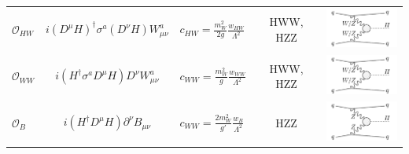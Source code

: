 \begin{tabular}{lcm{3cm}<{\centering}cm{4.5cm}<{\centering}}
    $\mathcal{O}_{HW}$ & $i(D^\mu H)^{\dagger}\sigma^a(D^\nu H)W^a_{\mu\nu}$ & $c_{HW}=\frac{m_W^2}{2g}\frac{w_{HW}}{\Lambda^2}$ & HWW, HZZ  & \vspace{.1cm}\includegraphics[width=2.5cm]{Figures/eft/eft_feynman/cHW.pdf} \\
    
    $\mathcal{O}_{WW}$ & $i(H^{\dagger}\sigma^aD^\mu H)D^\nu W^a_{\mu\nu}$ & $c_{WW}=\frac{m_W^2}{g}\frac{w_{WW}}{\Lambda^2}$ & HWW, HZZ & \vspace{.1cm}\includegraphics[width=2.5cm]{Figures/eft/eft_feynman/cHW.pdf} \\
    
    $\mathcal{O}_B$ & $i(H^{\dagger}D^\mu H)\partial^\nu B_{\mu\nu}$ & $c_{WW}=\frac{2m_W^2}{g'}\frac{w_{B}}{\Lambda^2}$ & HZZ & \vspace{.1cm}\includegraphics[width=2.5cm]{Figures/eft/eft_feynman/cB.pdf} \\

\end{tabular}